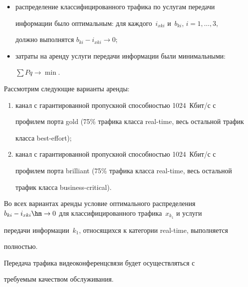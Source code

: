    \begin{itemize} %


\item распределение классифицированного трафика по услугам передачи 


информации было оптимальным: для каждого~$i_{xki}$ и~$b_{ki}$, $i=1,\ldots  ,3$, 


должно выполнятся $b_{ki}-i_{xki}\rightarrow 0$;


\item затраты на аренду услуги передачи информации были минимальными: 


$\sum Pq\rightarrow \min$.


\end{itemize}





   


   Рассмотрим следующие варианты аренды:


   \begin{enumerate}[(1)]


\item канал с гарантированной пропускной способностью 1024~Кбит/с с 


профилем порта gold (75\% трафика класса real-time, весь остальной трафик 


класса best-effort);


\item канал с гарантированной пропускной способностью 1024~Кбит/с с 


профилем порта brilliant (75\% трафика класса real-time, весь остальной 


трафик класса business-critical).


\end{enumerate}


     


     Во всех вариантах аренды условие оптимального распределения $b_{ki}-


i_{xki}\hm\rightarrow 0$ для классифицированного трафика~$x_{k_1}$ и услуги 


передачи информации~$k_1$, относящихся к категории real-time, выполняется 


полностью.


     


     Передача трафика видеоконференцсвязи будет осуществляться с 


требуемым качеством обслуживания.


